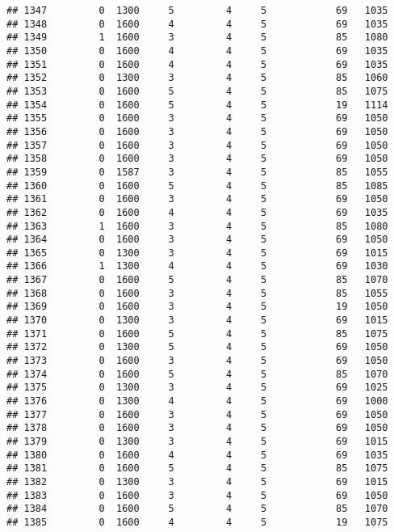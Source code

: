 \documentclass[]{article}
\begin{document}
\begin{verbatim}
## 1347         0  1300     5         4     5            69   1035
## 1348         0  1600     4         4     5            69   1035
## 1349         1  1600     3         4     5            85   1080
## 1350         0  1600     4         4     5            69   1035
## 1351         0  1600     4         4     5            69   1035
## 1352         0  1300     3         4     5            85   1060
## 1353         0  1600     5         4     5            85   1075
## 1354         0  1600     5         4     5            19   1114
## 1355         0  1600     3         4     5            69   1050
## 1356         0  1600     3         4     5            69   1050
## 1357         0  1600     3         4     5            69   1050
## 1358         0  1600     3         4     5            69   1050
## 1359         0  1587     3         4     5            85   1055
## 1360         0  1600     5         4     5            85   1085
## 1361         0  1600     3         4     5            69   1050
## 1362         0  1600     4         4     5            69   1035
## 1363         1  1600     3         4     5            85   1080
## 1364         0  1600     3         4     5            69   1050
## 1365         0  1300     3         4     5            69   1015
## 1366         1  1300     4         4     5            69   1030
## 1367         0  1600     5         4     5            85   1070
## 1368         0  1600     3         4     5            85   1055
## 1369         0  1600     3         4     5            19   1050
## 1370         0  1300     3         4     5            69   1015
## 1371         0  1600     5         4     5            85   1075
## 1372         0  1300     5         4     5            69   1050
## 1373         0  1600     3         4     5            69   1050
## 1374         0  1600     5         4     5            85   1070
## 1375         0  1300     3         4     5            69   1025
## 1376         0  1300     4         4     5            69   1000
## 1377         0  1600     3         4     5            69   1050
## 1378         0  1600     3         4     5            69   1050
## 1379         0  1300     3         4     5            69   1015
## 1380         0  1600     4         4     5            69   1035
## 1381         0  1600     5         4     5            85   1075
## 1382         0  1300     3         4     5            69   1015
## 1383         0  1600     3         4     5            69   1050
## 1384         0  1600     5         4     5            85   1070
## 1385         0  1600     4         4     5            19   1075

\end{verbatim}
\end{document}
